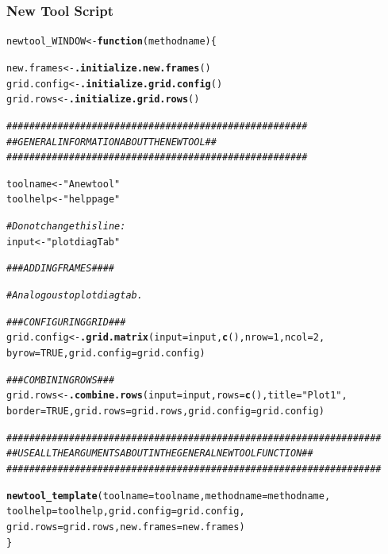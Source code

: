 \documentclass[a4paper]{article}\usepackage[]{graphicx}\usepackage[]{color}
\makeatletter
\newcommand{\hlnum}[1]{\textcolor[rgb]{0.686,0.059,0.569}{#1}}%
\newcommand{\hlstr}[1]{\textcolor[rgb]{0.192,0.494,0.8}{#1}}%
\newcommand{\hlcom}[1]{\textcolor[rgb]{0.678,0.584,0.686}{\textit{#1}}}%
\newcommand{\hlstd}[1]{\textcolor[rgb]{0.345,0.345,0.345}{#1}}%
\newcommand{\hlkwa}[1]{\textcolor[rgb]{0.161,0.373,0.58}{\textbf{#1}}}%
\newcommand{\hlkwb}[1]{\textcolor[rgb]{0.69,0.353,0.396}{#1}}%
\newcommand{\hlkwc}[1]{\textcolor[rgb]{0.333,0.667,0.333}{#1}}%
\newcommand{\hlkwd}[1]{\textcolor[rgb]{0.737,0.353,0.396}{\textbf{#1}}}%
\newenvironment{kframe}{%
 \def\at@end@of@kframe{}%
 \ifinner\ifhmode%
  \def\at@end@of@kframe{\end{minipage}}%
  \begin{minipage}{\columnwidth}%
 \fi\fi%
 \def\FrameCommand##1{\hskip\@totalleftmargin \hskip-\fboxsep
 \colorbox{shadecolor}{##1}\hskip-\fboxsep
     \hskip-\linewidth \hskip-\@totalleftmargin \hskip\columnwidth}%
 \MakeFramed {\advance\hsize-\width
   \@totalleftmargin\z@ \linewidth\hsize
   \@setminipage}}%
 {\par\unskip\endMakeFramed%
 \at@end@of@kframe}
\newenvironment{knitrout}{}{} %
\makeatother
\begin{document}
\subsubsection{New Tool Script}
\begin{knitrout}
\color{fgcolor}\begin{kframe}
\begin{alltt}
\hlstd{newtool_WINDOW} \hlkwb{<-} \hlkwa{function}\hlstd{(}\hlkwc{methodname}\hlstd{)\{}

        \hlstd{new.frames} \hlkwb{<-} \hlkwd{.initialize.new.frames}\hlstd{()}
        \hlstd{grid.config} \hlkwb{<-} \hlkwd{.initialize.grid.config}\hlstd{()}
        \hlstd{grid.rows} \hlkwb{<-} \hlkwd{.initialize.grid.rows}\hlstd{()}

        \hlcom{#####################################################}
        \hlcom{## GENERAL INFORMATION ABOUT THE NEW TOOL		   ##}
        \hlcom{#####################################################}

        \hlstd{toolname} \hlkwb{<-} \hlstr{"A new tool"}
        \hlstd{toolhelp} \hlkwb{<-} \hlstr{"helppage"}

        \hlcom{# Do not change this line:}
        \hlstd{input} \hlkwb{<-} \hlstr{"plotdiagTab"}

        \hlcom{### ADDING FRAMES ####}

        \hlcom{# Analogous to plotdiag tab.}

        \hlcom{### CONFIGURING GRID ###}
        \hlstd{grid.config} \hlkwb{<-} \hlkwd{.grid.matrix}\hlstd{(}\hlkwc{input}\hlstd{=input,}\hlkwd{c}\hlstd{(),}\hlkwc{nrow}\hlstd{=}\hlnum{1}\hlstd{,}\hlkwc{ncol}\hlstd{=}\hlnum{2}\hlstd{,}
           \hlkwc{byrow}\hlstd{=}\hlnum{TRUE}\hlstd{,}\hlkwc{grid.config}\hlstd{=grid.config)}


        \hlcom{### COMBINING ROWS ###}
        \hlstd{grid.rows} \hlkwb{<-} \hlkwd{.combine.rows}\hlstd{(}\hlkwc{input}\hlstd{=input,}\hlkwc{rows}\hlstd{=}\hlkwd{c}\hlstd{(),}\hlkwc{title}\hlstd{=}\hlstr{"Plot 1"}\hlstd{,}
           \hlkwc{border}\hlstd{=}\hlnum{TRUE}\hlstd{,}\hlkwc{grid.rows}\hlstd{=grid.rows,}\hlkwc{grid.config}\hlstd{=grid.config)}

        \hlcom{##################################################################}
        \hlcom{## USE ALL THE ARGUMENTS ABOUT IN THE GENERAL NEW TOOL FUNCTION ##}
        \hlcom{##################################################################}

        \hlkwd{newtool_template}\hlstd{(}\hlkwc{toolname}\hlstd{=toolname,}\hlkwc{methodname}\hlstd{=methodname,}
           \hlkwc{toolhelp}\hlstd{=toolhelp,}\hlkwc{grid.config}\hlstd{=grid.config,}
           \hlkwc{grid.rows}\hlstd{=grid.rows,}\hlkwc{new.frames}\hlstd{=new.frames)}
\hlstd{\}}
\end{alltt}
\end{kframe}
\end{knitrout}
\end{document}

